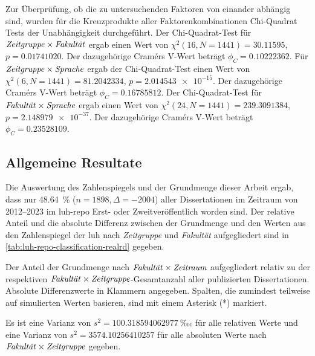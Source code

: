 Zur Überprüfung, ob die zu untersuchenden Faktoren von einander abhängig sind, wurden für die Kreuzprodukte aller Faktorenkombinationen Chi-Quadrat Tests der Unabhängigkeit durchgeführt.
Der Chi-Quadrat-Test für $\text{\textit{Zeitgruppe}}\times\text{\textit{Fakultät}}$ ergab einen Wert von $\chi^2 (\num{16}, N = \num{1441}) = \num[round-mode=places,round-precision=3]{30.11595}$, $p = \num[round-mode=places,round-precision=3]{0.01741020}$.
Der dazugehörige Cramérs V-Wert beträgt $\phi_C=\num[round-mode=places,round-precision=3]{0.10222362}$.
Für $\text{\textit{Zeitgruppe}}\times\text{\textit{Sprache}}$ ergab der Chi-Quadrat-Test einen Wert von $\chi^2 (\num{6}, N = \num{1441}) = \num[round-mode=places,round-precision=3]{81.2042334}$, $p = \num[round-mode=places,round-precision=3]{2.014543e-15}$.
Der dazugehörige Cramérs V-Wert beträgt $\phi_C=\num[round-mode=places,round-precision=3]{0.16785812}$.
Der Chi-Quadrat-Test für $\text{\textit{Fakultät}}\times\text{\textit{Sprache}}$ ergab einen Wert von $\chi^2 (\num{24}, N = \num{1441}) = \num[round-mode=places,round-precision=3]{239.3091384}$, $p = \num[round-mode=places,round-precision=3]{2.148979e-37}$.
Der dazugehörige Cramérs V-Wert beträgt $\phi_C=\num[round-mode=places,round-precision=3]{0.23528109}$.


\subsection{Allgemeine Resultate}\label{sec:luh-repo-results-general}
Die Auswertung des Zahlenspiegels und der Grundmenge dieser Arbeit ergab, dass nur \SI{48,64}{\percent} ($n=\num{1898},\Delta=\num{-2004}$) aller Dissertationen im Zeitraum von 2012--2023 im \gls{luh-repo} Erst- oder Zweitveröffentlich worden sind.
Der relative Anteil und die absolute Differenz zwischen der Grundmenge und den Werten aus den Zahlenspiegel der \gls{luh} nach \textit{Zeitgruppe} und \textit{Fakultät} aufgegliedert sind in \cref{tab:luh-repo-classification-realrd} gegeben.
\begin{table}[!htbp]
	\caption{Der Anteil der Grundmenge nach $\text{\textit{Fakultät}}\times\text{\textit{Zeitraum}}$ aufgegliedert relativ zu der respektiven $\text{\textit{Fakultät}}\times\text{\textit{Zeitgruppe}}$-Gesamtanzahl aller publizierten Dissertationen.
    Absolute Differenzwerte in Klammern angegeben.
    Spalten, die zumindest teilweise auf simulierten Werten basieren, sind mit einem Asterisk (*) markiert.}
    
    \label{tab:luh-repo-zahlenspiegel-relative-grundmenge}
\end{table}
Es ist eine Varianz von $s^2=\SI[round-mode=places,round-precision=3]{100.318594062977}{‱}$ für alle relativen Werte und eine Varianz von $s^2=\num[round-mode=places,round-precision=3]{3574.10256410257}$ für alle absoluten Werte nach $\text{\textit{Fakultät}}\times\text{\textit{Zeitgruppe}}$ gegeben.

